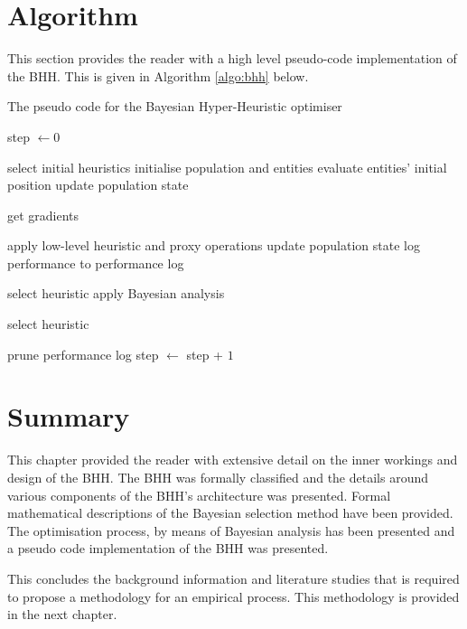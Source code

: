 \section{Algorithm}
\label{sec:bhh:algorithm}

This section provides the reader with a high level pseudo-code implementation of the \ac{BHH}. This is given in Algorithm \ref{algo:bhh} below.

\begin{algorithm}[H]
      \caption{The pseudo code for the  Bayesian Hyper-Heuristic optimiser}
      \label{algo:bhh}
      \begin{algorithmic}
            \State step $\gets 0$

            \State select initial heuristics
            \State initialise population and entities
            \State evaluate entities' initial position
            \State update population state

            \State get gradients
            \EndIf

            \State apply low-level heuristic and proxy operations
            \State update population state
            \State log performance to performance log

            \State select heuristic
            \Else
            \State apply Bayesian analysis
            \EndIf

            \State select heuristic
            \EndIf

            \State prune performance log
            \EndIf
            \EndIf
            \EndFor
            \State step $\gets$ step + $1$
            \EndWhile
      \end{algorithmic}
\end{algorithm}

\section{Summary}
\label{sec:bhh:summary}

This chapter provided the reader with extensive detail on the inner workings and design of the \ac{BHH}. The \ac{BHH} was formally classified and the details around various components of the \ac{BHH}'s architecture was presented. Formal mathematical descriptions of the Bayesian selection method have been provided. The optimisation process, by means of Bayesian analysis has been presented and a pseudo code implementation of the \ac{BHH} was presented.

This concludes the background information and literature studies that is required to propose a methodology for an empirical process. This methodology is provided in the next chapter.
